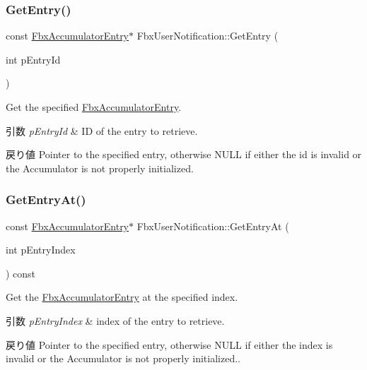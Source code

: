 \subsubsection{\texorpdfstring{Get\+Entry()}{GetEntry()}}
{\footnotesize\ttfamily const \hyperlink{class_fbx_accumulator_entry}{Fbx\+Accumulator\+Entry}$\ast$ Fbx\+User\+Notification\+::\+Get\+Entry (\begin{DoxyParamCaption}\item[{int}]{p\+Entry\+Id }\end{DoxyParamCaption})}

Get the specified \hyperlink{class_fbx_accumulator_entry}{Fbx\+Accumulator\+Entry}. 
\begin{DoxyParams}{引数}
{\em p\+Entry\+Id} & ID of the entry to retrieve. \\
\hline
\end{DoxyParams}
\begin{DoxyReturn}{戻り値}
Pointer to the specified entry, otherwise {\ttfamily N\+U\+LL} if either the id is invalid or the Accumulator is not properly initialized. 
\end{DoxyReturn}
\mbox{\label{class_fbx_user_notification_a78fc0966bfef1ea2a17f7a4ccd4a7318}} 
\subsubsection{\texorpdfstring{Get\+Entry\+At()}{GetEntryAt()}}
{\footnotesize\ttfamily const \hyperlink{class_fbx_accumulator_entry}{Fbx\+Accumulator\+Entry}$\ast$ Fbx\+User\+Notification\+::\+Get\+Entry\+At (\begin{DoxyParamCaption}\item[{int}]{p\+Entry\+Index }\end{DoxyParamCaption}) const}

Get the \hyperlink{class_fbx_accumulator_entry}{Fbx\+Accumulator\+Entry} at the specified index. 
\begin{DoxyParams}{引数}
{\em p\+Entry\+Index} & index of the entry to retrieve. \\
\hline
\end{DoxyParams}
\begin{DoxyReturn}{戻り値}
Pointer to the specified entry, otherwise {\ttfamily N\+U\+LL} if either the index is invalid or the Accumulator is not properly initialized.. 
\end{DoxyReturn}
\mbox{\label{class_fbx_user_notification_a65aaed76d9cba16e213bf548b10e64fd}} 
